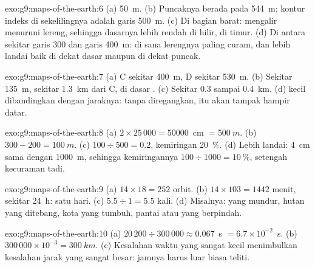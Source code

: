 \begin{solution}{exo:g9:maps-of-the-earth:6}
(a) \qty{50}{m}. (b) Puncaknya berada pada \qty{544}{m}; kontur indeks di
sekelilingnya adalah garis \qty{500}{m}. (c) Di bagian barat: 
mengalir menuruni lereng, sehingga dasarnya lebih rendah di hilir, di
timur. (d) Di antara sekitar garis 300 dan garis \qty{400}{m}: di sana
lerengnya paling curam, dan lebih landai baik di dekat dasar  maupun
di dekat puncak.
\end{solution}

\begin{solution}{exo:g9:maps-of-the-earth:7}
(a) C sekitar \qty{400}{m}, D sekitar \qty{530}{m}. (b) Sekitar
\qty{135}{m}, sekitar \qty{1.3}{km} dari C, di dasar . (c) Sekitar
0.3 sampai \qty{0.4}{km}. (d)  kecil dibandingkan dengan
jaraknya: tanpa diregangkan,  itu akan tampak hampir datar.
\end{solution}

\begin{solution}{exo:g9:maps-of-the-earth:8}
(a) $2 \times 25\,000 = \num{50000}$~cm $= \qty{500}{m}$. (b) $300 - 200 =
\qty{100}{m}$. (c) $100 \div 500 = 0.2$, kemiringan \qty{20}{\%}. (d) Lebih
landai: \qty{4}{cm} sama dengan \qty{1000}{m}, sehingga kemiringannya
$100 \div 1000 = \qty{10}{\%}$, setengah kecuraman tadi.
\end{solution}

\begin{solution}{exo:g9:maps-of-the-earth:9}
(a) $14 \times 18 = 252$ orbit. (b) $14 \times 103 = 1442$ menit, sekitar
\qty{24}{h}: satu hari. (c) $5.5 \div 1 = 5.5$ kali. (d) Misalnya: 
yang mundur, hutan yang ditebang, kota yang tumbuh, pantai atau  yang
berpindah.
\end{solution}

\begin{solution}{exo:g9:maps-of-the-earth:10}
(a) $20\,200 \div 300\,000 \approx 0.067$~s $= 6.7 \times 10^{-2}$~s.
(b) $300\,000 \times 10^{-3} = \qty{300}{km}$. (c) Kesalahan waktu yang
sangat kecil menimbulkan kesalahan jarak yang sangat besar: jamnya harus
luar biasa teliti.
\end{solution}

